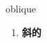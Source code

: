 
\begin{frame}
{\huge oblique}
\begin{center}
\begin{enumerate}\Large
  \item \textbf{斜的}
\end{enumerate}
\end{center}
\end{frame}
